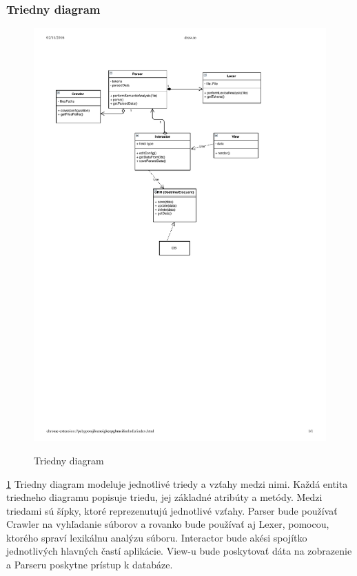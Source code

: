 \documentclass[12pt,a4paper]{article}
\begin{document}
\subsubsection{Triedny diagram}
\begin{figure}[H]
	\caption{Triedny diagram}
	\includegraphics[width=\textwidth]{class_diagram}
	\label{fig:class_diagram}
\end{figure}
\ref{fig:class_diagram}
Triedny diagram modeluje jednotlivé triedy a vzťahy medzi nimi. Každá entita triedneho diagramu popisuje triedu, jej základné atribúty a metódy. Medzi triedami sú šípky, ktoré reprezenutujú jednotlivé vzťahy. Parser bude používať Crawler na vyhľadanie súborov a rovanko bude používať aj Lexer, pomocou, ktorého spraví lexikálnu analýzu súboru. Interactor bude akési spojítko jednotlivých hlavných častí aplikácie. View-u bude poskytovať dáta na zobrazenie a Parseru poskytne prístup k databáze.
\end{document}
